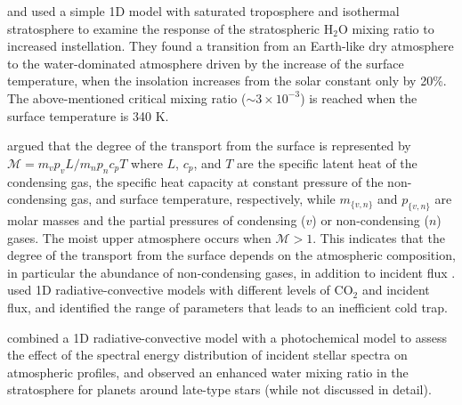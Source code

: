 \documentclass[11pt,numberedappendix,twocolappendix,]{emulateapj}
\def\water{H$_2$O }
\begin{document}
\citet{Kasting1993} and \citet{Kopparapu2013} used a simple 1D model with saturated troposphere and isothermal stratosphere to examine the response of the stratospheric \water mixing ratio to increased instellation. 
They found a transition from an Earth-like dry atmosphere to the water-dominated atmosphere driven by the increase of the surface temperature, when the insolation increases from the solar constant only by 20\%. 
The above-mentioned critical mixing ratio ($\sim 3 \times 10^{-3}$) is reached when the surface temperature is 340 K. 


\citet{Wordsworth2013,Wordsworth2014} argued that the degree of the transport from the surface is represented by $\mathcal{M} = m_v p_v L / m_n p_n c_p T $ where $L$, $c_p$, and $T$ are the specific latent heat of the condensing gas, the specific heat capacity at constant pressure of the non-condensing gas, and surface  temperature, respectively, while $m_{\{v,n\}}$ and $p_{\{v,n\}}$ are molar masses  and the partial pressures of condensing ($v$) or non-condensing ($n$) gases. 
The moist upper atmosphere occurs when $\mathcal{M} > 1$. 
This indicates that the degree of the transport from the surface depends on the atmospheric composition, in particular the abundance of non-condensing gases, in addition to incident flux  \citep{Wordsworth2014}. 
\citet{Wordsworth2013} used 1D radiative-convective models with different levels of CO$_2$ and incident flux, and identified the range of parameters that leads to an inefficient cold trap. 

\citet{Rugheimer2013,Rugheimer2015} combined a 1D radiative-convective model with a photochemical model to assess the effect of the spectral energy distribution of incident stellar spectra on atmospheric profiles, and observed an enhanced water mixing ratio in the stratosphere for planets around late-type stars (while not discussed in detail). 
\end{document}
